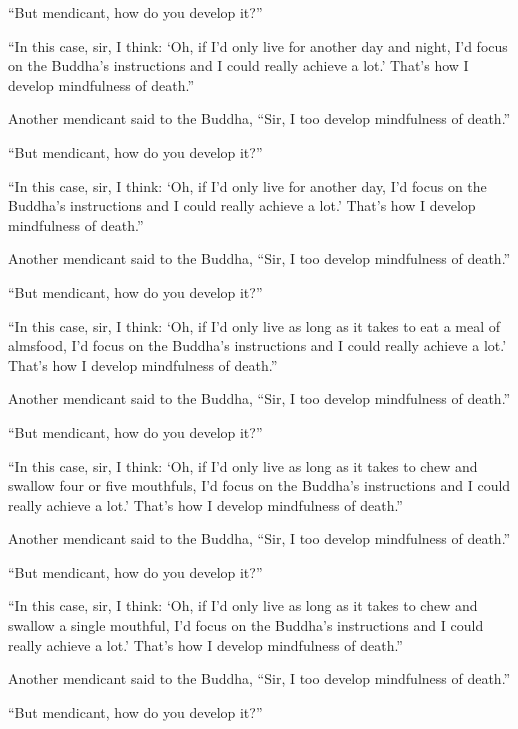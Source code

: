 \documentclass[12pt,openany]{book}%
\begin{document}
“But mendicant, how do you develop it?” 

“In this case, sir, I think: ‘Oh, if I’d only live for another day and night, I’d focus on the Buddha’s instructions and I could really achieve a lot.’ That’s how I develop mindfulness of death.” 

Another mendicant said to the Buddha, “Sir, I too develop mindfulness of death.” 

“But mendicant, how do you develop it?” 

“In this case, sir, I think: ‘Oh, if I’d only live for another day, I’d focus on the Buddha’s instructions and I could really achieve a lot.’ That’s how I develop mindfulness of death.” 

Another mendicant said to the Buddha, “Sir, I too develop mindfulness of death.” 

“But mendicant, how do you develop it?” 

“In this case, sir, I think: ‘Oh, if I’d only live as long as it takes to eat a meal of almsfood, I’d focus on the Buddha’s instructions and I could really achieve a lot.’ That’s how I develop mindfulness of death.” 

Another mendicant said to the Buddha, “Sir, I too develop mindfulness of death.” 

“But mendicant, how do you develop it?” 

“In this case, sir, I think: ‘Oh, if I’d only live as long as it takes to chew and swallow four or five mouthfuls, I’d focus on the Buddha’s instructions and I could really achieve a lot.’ That’s how I develop mindfulness of death.” 

Another mendicant said to the Buddha, “Sir, I too develop mindfulness of death.” 

“But mendicant, how do you develop it?” 

“In this case, sir, I think: ‘Oh, if I’d only live as long as it takes to chew and swallow a single mouthful, I’d focus on the Buddha’s instructions and I could really achieve a lot.’ That’s how I develop mindfulness of death.” 

Another mendicant said to the Buddha, “Sir, I too develop mindfulness of death.” 

“But mendicant, how do you develop it?” 
\end{document}
